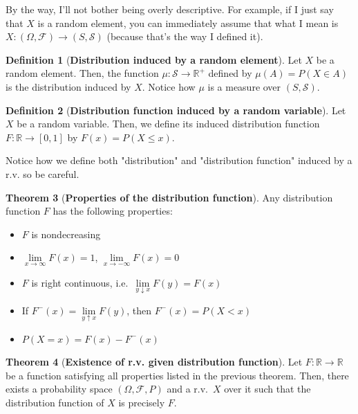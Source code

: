\documentclass{article}
\theoremstyle{definition}
\newtheorem{theorem}{Theorem}[section]
\newtheorem{definition}[theorem]{Definition}
\begin{document}
By the way, I'll not bother being overly descriptive. For example, if I just say that $X$ is a random element, you can immediately assume that what I mean is $X : (\Omega, \mathcal{F}) \to (S, \mathcal{S})$ (because that's the way I defined it).


\begin{definition}[\textbf{Distribution induced by a random element}]
    Let $X$ be a random element. Then, the function $\mu : \mathcal{S} \to \mathbb{R}^+$ defined by $\mu(A) = P(X \in A)$ is the distribution induced by $X$. Notice how $\mu$ is a measure over $(S, \mathcal{S})$.
\end{definition}

\begin{definition}[\textbf{Distribution function induced by a random variable}]
    Let $X$ be a random variable. Then, we define its induced distribution function $F : \mathbb{R} \to [0, 1]$ by $F(x) = P(X \leq x)$.
\end{definition}

Notice how we define both "distribution" and "distribution function" induced by a r.v. so be careful.


\begin{theorem}[\textbf{Properties of the distribution function}]
    Any distribution function $F$ has the following properties:
    \begin{itemize}
        \item $F$ is nondecreasing
        \item $\lim\limits_{x \to \infty} F(x) = 1$, $\lim\limits_{x \to -\infty} F(x) = 0$
        \item $F$ is right continuous, i.e.\ $\lim\limits_{y \downarrow x} F(y) = F(x)$
        \item If $F^{-}(x) = \lim\limits_{y \uparrow x} F(y)$, then $F^{-}(x) = P(X < x)$
        \item $P(X=x) = F(x) - F^{-}(x)$
    \end{itemize}
\end{theorem}



\begin{theorem}[\textbf{Existence of r.v. given distribution function}]\label{thm:existence-rv}
    Let $F : \mathbb{R} \to \mathbb{R}$ be a function satisfying all properties listed in the previous theorem. Then, there exists a probability space $(\Omega, \mathcal{F}, P)$ and a r.v.\ $X$ over it such that the distribution function of $X$ is precisely $F$.
\end{theorem}
\end{document}
